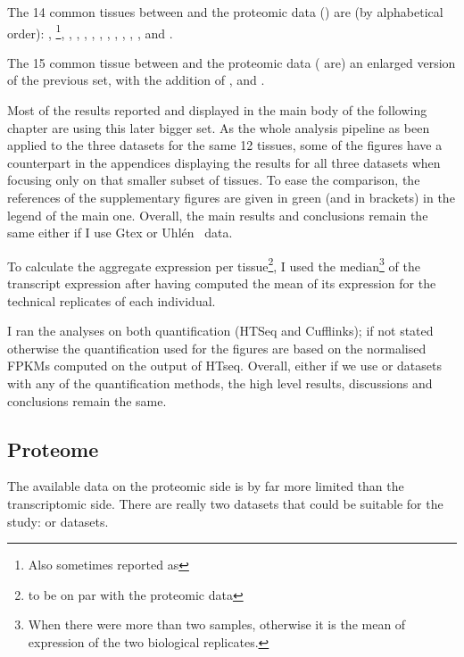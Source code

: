 The 14 common tissues between  and the proteomic data
() are
(by alphabetical order):  , \footnote{Also
sometimes reported as },
, , , ,
, , , , ,
,  and .

The 15 common tissue between  and the proteomic data
( are)
an enlarged version of the previous set, with the addition of ,  and .

Most of the results reported and displayed in the main body
of the following chapter are using this later bigger set. As the whole analysis
pipeline as been applied to the three datasets
for the same 12 tissues, some of the figures have a counterpart in the
appendices displaying the results for all three datasets when focusing only on
that smaller subset of tissues. To ease the comparison, the references of the
supplementary figures are given in green (and in brackets) in the legend of the
main one. Overall, the main results and conclusions remain the same either if
I use Gtex or Uhlén \etal\ data.

To calculate the aggregate expression per tissue\footnote{to be on par with the
proteomic data}, I used the median\footnote{When there were more than
two samples, otherwise it is the mean of expression of the two biological
replicates.} of the transcript expression after having computed the mean of its
expression for the technical replicates of each individual.

I ran the analyses on both quantification (HTSeq and Cufflinks); if not stated
otherwise the quantification used for the figures are based on the normalised
\glspl{FPKM} computed on the output of HTseq.
Overall, either if we use  or
 datasets with any of the quantification methods, the high level
results, discussions and conclusions remain the same.

\subsection{Proteome}
The available data on the proteomic side is by far more limited than the
transcriptomic side. There are really two datasets that could be suitable for
the study:  or  datasets.


